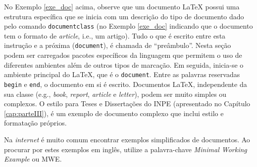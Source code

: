 
No Exemplo \ref{exe_doc} acima, observe que um documento \LaTeX{} possui uma estrutura específica que se inicia com um descrição do tipo de documento dado pelo comando \texttt{documentclass} (no Exemplo \ref{exe_doc} indicando que o documento tem o formato de \textit{article}, i.e., um artigo). Tudo o que é escrito entre esta instrução e a próxima ({\tt document}), é chamada de ``preâmbulo''. Nesta seção podem ser carregados pacotes específicos da linguagem que permitem o uso de diferentes ambientes além de outros tipos de marcação. Em seguida, inicia-se o ambiente principal do \LaTeX{}, que é o \texttt{document}. Entre as palavras reservadas \texttt{begin} e \texttt{end}, o documento em si é escrito. Documentos \LaTeX{}, independente da sua classe (e.g., \textit{book}, \textit{report}, \textit{article} e \textit{letter}), podem ser muito simples ou complexos. O estilo para Teses e Dissertações do INPE (apresentado no Capítulo \ref{cap:parteIII}), é um exemplo de documento complexo que inclui estilo e formatação próprios.

\begin{marker}
  Na \textit{internet} é muito comum encontrar exemplos simplificados de documentos. Ao procurar por estes exemplos em inglês, utilize a palavra-chave \textit{Minimal Working Example} ou MWE.
\end{marker}

